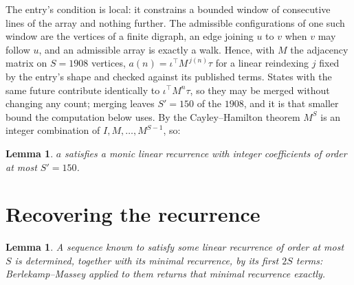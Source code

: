 \documentclass[11pt,a4paper]{article}
\theoremstyle{plain}
\newtheorem{lemma}[theorem]{Lemma}
\theoremstyle{definition}
\begin{document}
The entry's condition is local: it constrains a bounded window of consecutive lines of the
array and nothing further. The admissible configurations of one such window are the vertices
of a finite digraph, an edge joining $u$ to $v$ when $v$ may follow $u$, and an admissible
array is exactly a walk. Hence, with $M$ the adjacency matrix on $S=1908$ vertices,
$a(n)=\iota^{\!\top}M^{\,j(n)}\tau$ for a linear reindexing $j$ fixed by the entry's shape
and checked against its published terms. States with the same future contribute identically to $\iota^{\!\top}M^n\tau$, so they may be merged without changing any count; merging leaves $S'=150$ of the $1908$, and it is that smaller bound the computation below uses. By the Cayley--Hamilton theorem $M^{S}$ is an
integer combination of $I,M,\dots,M^{S-1}$, so:

\begin{lemma}\label{lem:cf}
$a$ satisfies a monic linear recurrence with integer coefficients of order at most
$S'=150$.
\end{lemma}

\section{Recovering the recurrence}

\begin{lemma}\label{lem:bm}
A sequence known to satisfy some linear recurrence of order at most $S$ is determined, together
with its minimal recurrence, by its first $2S$ terms: Berlekamp--Massey applied to them returns
that minimal recurrence exactly.
\end{lemma}
\end{document}
